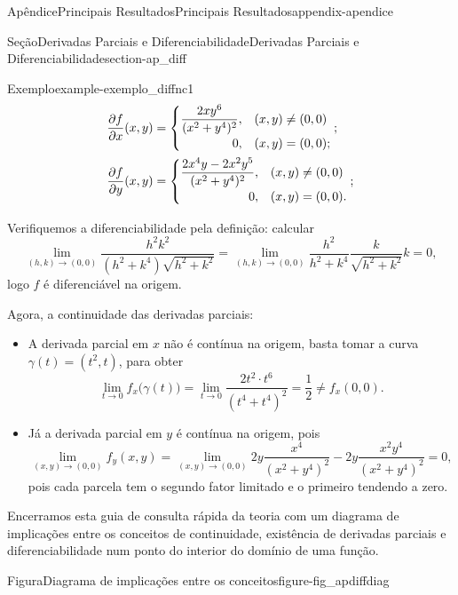 \documentclass[oneside,10pt,]{book}
\numberwithin{equation}{section}
\begin{document}
\begin{appendixptx}{Apêndice}{Principais Resultados}{}{Principais Resultados}{}{}{appendix-apendice}
\begin{sectionptx}{Seção}{Derivadas Parciais e Diferenciabilidade}{}{Derivadas Parciais e Diferenciabilidade}{}{}{section-ap_diff}
\begin{example}{Exemplo}{}{example-exemplo_diffnc1}
\begin{align*}
\dfrac{\partial f}{\partial x}(x,y)&=\begin{cases}
\dfrac{2xy^6}{(x^2+y^4)^2},& (x,y)\neq(0,0)\\
\hfill 0,& (x,y)=(0,0);
\end{cases};\\
\dfrac{\partial f}{\partial y}(x,y)&=\begin{cases}
\dfrac{2x^4y-2x^2y^5}{(x^2+y^4)^2},& (x,y)\neq(0,0)\\
\hfill 0,& (x,y)=(0,0).
\end{cases};
\end{align*}
%
\par
Verifiquemos a diferenciabilidade pela definição: calcular%
\begin{equation*}
\lim\limits_{(h,k)\to(0,0)}\dfrac{h^2k^2}{(h^2+k^4)\sqrt{h^2+k^2}}
=\lim\limits_{(h,k)\to(0,0)}\dfrac{h^2}{h^2+k^4}\dfrac{k}{\sqrt{h^2+k^2}}k=0,
\end{equation*}
logo \(f\) é diferenciável na origem.%
\par
Agora, a continuidade das derivadas parciais:%
\begin{itemize}[label=\textbullet]
\item{}A derivada parcial em \(x\) não é contínua na origem, basta tomar a curva \(\gamma(t)=(t^2,t)\), para obter%
\begin{equation*}
\lim\limits_{t\to 0}f_x\big(\gamma(t)\big)=\lim\limits_{t\to
0}\dfrac{2t^2\cdot t^6}{(t^4+t^4)^2}=\dfrac{1}{2}\neq f_x(0,0).
\end{equation*}
%
\item{}Já a derivada parcial em \(y\) é contínua na origem, pois%
\begin{equation*}
\lim\limits_{(x,y)\to(0,0)}f_y(x,y)=
\lim\limits_{(x,y)\to(0,0)}2y\dfrac{x^4}{(x^2+y^4)^2}
-2y\dfrac{x^2y^4}{(x^2+y^4)^2}=0,
\end{equation*}
pois cada parcela tem o segundo fator limitado e o primeiro tendendo a zero.%
\end{itemize}
%
\end{example}
Encerramos esta guia de consulta rápida da teoria com um diagrama de implicações entre os conceitos de continuidade, existência de derivadas parciais e diferenciabilidade num ponto do interior do domínio de uma função. \begin{figureptx}{Figura}{Diagrama de implicações entre os conceitos}{figure-fig_apdiffdiag}{}%
\begin{image}{0.125}{0.75}{0.125}{}%

\end{image}
\end{figureptx}
\end{sectionptx}
\end{appendixptx}
\end{document}
